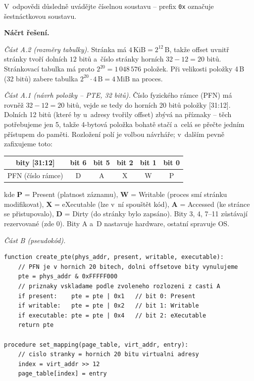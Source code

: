 V~odpovědi důsledně uvádějte číselnou soustavu -- prefix \texttt{0x} označuje šestnáctkovou soustavu.

\medskip
\noindent\textbf{Náčrt řešení.}\par

\noindent\textit{Část A.2 (rozměry tabulky).}
Stránka má $4\,\text{KiB}=2^{12}$\,B, takže offset uvnitř stránky tvoří dolních
$\boxed{12}$ bitů a~číslo stránky horních $32-12=\boxed{20}$ bitů. Stránkovací tabulka má
proto $2^{20}=\boxed{1\,048\,576}$ položek. Při velikosti položky 4\,B (32 bitů) zabere
tabulka $2^{20}\cdot 4\,\text{B}=\boxed{4\,\text{MiB}}$ na proces.

\medskip
\noindent\textit{Část A.1 (návrh položky -- PTE, 32 bitů).}
Číslo fyzického rámce (PFN) má rovněž $32-12=20$ bitů, vejde se tedy do horních 20 bitů
položky [31:12]. Dolních 12 bitů (které by u~adresy tvořily offset) zbývá na příznaky --
těch potřebujeme jen 5, takže 4-bytová položka bohatě stačí a~celá se přečte jedním přístupem
do paměti. Rozložení polí je volbou návrháře; v~dalším pevně zafixujeme toto:
\begin{center}
\begin{tabular}{|c|c|c|c|c|c|}
\hline
\textbf{bity [31:12]} & \textbf{bit 6} & \textbf{bit 5} & \textbf{bit 2} & \textbf{bit 1} & \textbf{bit 0} \\
\hline
PFN (číslo rámce) & D & A & X & W & P \\
\hline
\end{tabular}
\end{center}
kde \textbf{P} = Present (platnost záznamu), \textbf{W} = Writable (proces smí stránku
modifikovat), \textbf{X} = eXecutable (lze v~ní spouštět kód), \textbf{A} = Accessed
(ke stránce se přistupovalo), \textbf{D} = Dirty (do stránky bylo zapsáno). Bity 3, 4, 7--11
zůstávají rezervované (zde 0). Bity A a~D nastavuje hardware, ostatní spravuje OS.

\medskip
\noindent\textit{Část B (pseudokód).}
\begin{lstlisting}
function create_pte(phys_addr, present, writable, executable):
    // PFN je v hornich 20 bitech, dolni offsetove bity vynulujeme
    pte = phys_addr & 0xFFFFF000
    // priznaky vskladame podle zvoleneho rozlozeni z casti A
    if present:    pte = pte | 0x1   // bit 0: Present
    if writable:   pte = pte | 0x2   // bit 1: Writable
    if executable: pte = pte | 0x4   // bit 2: eXecutable
    return pte

procedure set_mapping(page_table, virt_addr, entry):
    // cislo stranky = hornich 20 bitu virtualni adresy
    index = virt_addr >> 12
    page_table[index] = entry
\end{lstlisting}

